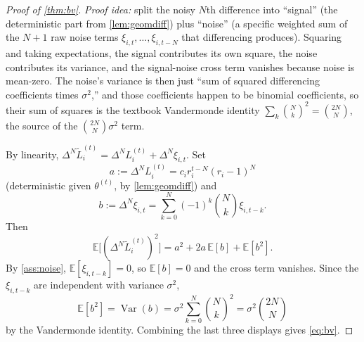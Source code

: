 \documentclass{article}
\theoremstyle{plain}
\theoremstyle{definition}
\theoremstyle{remark}
\DeclareMathOperator{\Var}{Var}
\begin{document}
\begin{proof}[Proof of \cref{thm:bv}]
\emph{Proof idea:} split the noisy $N$th difference into ``signal'' (the deterministic part from \cref{lem:geomdiff}) plus ``noise'' (a specific weighted sum of the $N{+}1$ raw noise terms $\xi_{i,t},\dots,\xi_{i,t-N}$ that differencing produces). Squaring and taking expectations, the signal contributes its own square, the noise contributes its variance, and the signal-noise cross term vanishes because noise is mean-zero. The noise's variance is then just ``sum of squared differencing coefficients times $\sigma^2$,'' and those coefficients happen to be binomial coefficients, so their sum of squares is the textbook Vandermonde identity $\sum_k\binom{N}{k}^2=\binom{2N}{N}$, the source of the $\binom{2N}{N}\sigma^2$ term.

By linearity, $\Delta^N\tilde L_i^{(t)} = \Delta^N L_i^{(t)} + \Delta^N\xi_{i,t}$. Set
\[
a := \Delta^N L_i^{(t)} = c_i r_i^{t-N}(r_i-1)^N
\]
(deterministic given $\theta^{(t)}$, by \cref{lem:geomdiff}) and
\[
b := \Delta^N\xi_{i,t} = \sum_{k=0}^N(-1)^k\binom Nk\xi_{i,t-k}.
\]
Then
\[
\mathbb E\big[(\Delta^N\tilde L_i^{(t)})^2\big] = a^2 + 2a\,\mathbb E[b] + \mathbb E[b^2].
\]
By \cref{ass:noise}, $\mathbb E[\xi_{i,t-k}]=0$, so $\mathbb E[b]=0$ and the cross term vanishes. Since the $\xi_{i,t-k}$ are independent with variance $\sigma^2$,
\[
\mathbb E[b^2] = \Var(b) = \sigma^2\sum_{k=0}^N\binom Nk^2 = \sigma^2\binom{2N}N
\]
by the Vandermonde identity. Combining the last three displays gives \cref{eq:bv}.
\end{proof}
\end{document}
